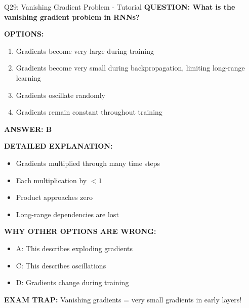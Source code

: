 \documentclass[8pt]{beamer}
\begin{document}
	\begin{frame}{Q29: Vanishing Gradient Problem - Tutorial}
		\fontsize{6.5}{7.5}\selectfont
		\textbf{QUESTION: What is the vanishing gradient problem in RNNs?}
		
		\vspace{0.1cm}
		\textbf{OPTIONS:}
		\begin{enumerate}
			\item Gradients become very large during training
			\item Gradients become very small during backpropagation, limiting long-range learning
			\item Gradients oscillate randomly
			\item Gradients remain constant throughout training
		\end{enumerate}
		
		\vspace{0.1cm}
		\textcolor{myblue}{\textbf{ANSWER: B}}
		
		\vspace{0.1cm}
		\textbf{DETAILED EXPLANATION:}
		\begin{itemize}
			\item Gradients multiplied through many time steps
			\item Each multiplication by $< 1$
			\item Product approaches zero
			\item Long-range dependencies are lost
		\end{itemize}
		
		\vspace{0.1cm}
		\textcolor{myred}{\textbf{WHY OTHER OPTIONS ARE WRONG:}}
		\begin{itemize}
			\item \textcolor{myred}{A:} This describes exploding gradients
			\item \textcolor{myred}{C:} This describes oscillations
			\item \textcolor{myred}{D:} Gradients change during training
		\end{itemize}
		
		\textcolor{myred}{\textbf{EXAM TRAP:}} Vanishing gradients = \textcolor{myblue}{very small gradients} in early layers!
	\end{frame}
	
\end{document}
